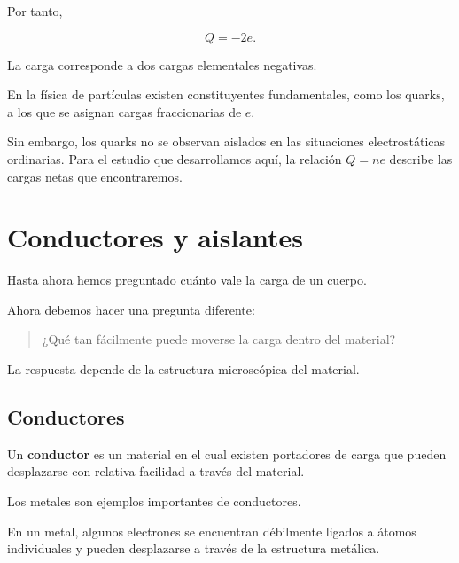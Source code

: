 Por tanto,

\[
Q=-2e.
\]

La carga corresponde a dos cargas elementales negativas.

\begin{nota}
En la física de partículas existen constituyentes fundamentales, como los
quarks, a los que se asignan cargas fraccionarias de \(e\).

Sin embargo, los quarks no se observan aislados en las situaciones
electrostáticas ordinarias. Para el estudio que desarrollamos aquí, la
relación \(Q=ne\) describe las cargas netas que encontraremos.
\end{nota}



\section{Conductores y aislantes}

Hasta ahora hemos preguntado cuánto vale la carga de un cuerpo.

Ahora debemos hacer una pregunta diferente:

\begin{quote}
¿Qué tan fácilmente puede moverse la carga dentro del material?
\end{quote}

La respuesta depende de la estructura microscópica del material.



\subsection{Conductores}

\begin{definicion}
Un \textbf{conductor} es un material en el cual existen portadores de carga
que pueden desplazarse con relativa facilidad a través del material.
\end{definicion}

Los metales son ejemplos importantes de conductores.

En un metal, algunos electrones se encuentran débilmente ligados a átomos
individuales y pueden desplazarse a través de la estructura metálica.


